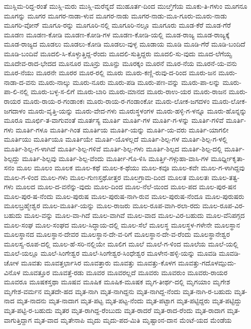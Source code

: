 ಮುಸ್ಲಿಮ-ರಿದ್ದ-ರಂತೆ
ಮುಸ್ಲಿ-ಮರು
ಮುಸ್ಲಿ-ಮರೆನ್ನದೆ
ಮುಹೂರ್ತ-ದಿಂದ
ಮುೞ್ತಿಗೆಯ
ಮೂಕು-ತಿ-ಗಳುಂ
ಮೂಗನೂ
ಮೂಗನ್ನು
ಮೂಗರ
ಮೂಗರ-ನಾಡಾ-ಳುವ
ಮೂಗರ-ನಾಡು
ಮೂಗರ-ನಾಡು-ಮೂ-ಗೂರು-ಮೂರು-ನಾಡು
ಮೂಗರಿ-ವೋನ್
ಮೂಗೂ-ರನ್ನು
ಮೂಗೂರಿ-ನಲ್ಲಿ
ಮೂಗೂರಿ-ನಲ್ಲೂ
ಮೂಗೂರು
ಮೂಡ-ಕೆರೆ
ಮೂಡ-ಗೆರೆ
ಮೂಡಣ
ಮೂಡಣ-ಕೋಡಿ
ಮೂಡಣ-ಕೋಡಿ-ಗಳ
ಮೂಡಣ-ಕೋಡಿ-ಯಲ್ಲಿ
ಮೂಡ-ರಾಜ್ಯ
ಮೂಡ-ರಾಜ್ಯಕ್ಕೆ
ಮೂಡ-ರಾಜ್ಯದ
ಮೂಡಲು
ಮೂಡಲು-ಕೋಡಿ
ಮೂಡಲು-ವುಳ್ಳ
ಮೂಡಾಯ
ಮೂಡಿ
ಮೂಡಿ-ಗೆರೆ
ಮೂಡಿ-ಬಂದಿದೆ
ಮೂಡಿ-ಬಂದಿವೆ
ಮೂದಲಿ-ಸಿ-ಕೊಳ್ಳುತ್ತಿದ್ದ-ರೆಂದು
ಮೂದಲಿ-ಸುತ್ತಿದ್ದರು
ಮೂದಲಿ-ಸು-ವುದು
ಮೂದ-ಲೆಗೆಯ್ವ
ಮೂದೇವ-ರಾದ-ಭೇದದ
ಮೂನೂರ
ಮೂನ್ರು
ಮೂನ್ಱು
ಮೂರಕ್ಕಂ
ಮೂರನೆ
ಮೂರ-ನೆಯ
ಮೂರನೆ-ಯ-ವನು
ಮೂರ-ನೆಯು
ಮೂರನೇ
ಮೂರರ
ಮೂರ-ರಲ್ಲಿ
ಮೂರು
ಮೂರು-ಕಣ್ಣಿ-ರುವು-ದ-ರಿಂದ
ಮೂರು-ಜನ
ಮೂರು-ನಾಡಾ-ದ-ವನು
ಮೂರು-ನಾಲ್ಕು
ಮೂರು-ನೂರು
ಮೂರು-ಪಡಿ
ಮೂರು-ಪಣ-ವನ್ನು
ಮೂರು-ಪಾ-ಲನ್ನು
ಮೂರು-ಪಾ-ಲಿ-ನಲ್ಲಿ
ಮೂರು-ಬಳ್ಳ-ಸ-ಲಿಗೆ
ಮೂರು-ಬಾರಿ
ಮೂರು-ಮಾನದ
ಮೂರು-ರಾಉ-ಯರ
ಮೂರು-ರಾಜನ
ಮೂರು-ರಾಯರ
ಮೂರು-ರಾಯ-ರ-ಗಂಡಾಂಕಃ
ಮೂರು-ರಾಯ-ರ-ಗಂಡಾಂಕೋ
ಮೂರು-ಲೋಕ-ಜಗದಳಂ
ಮೂರು-ಲೋಕ-ಜಗದಾಳಂ
ಮೂರು-ವೃತ್ತಿ-ಯನ್ನು
ಮೂರು-ವೇದ-ಗಳು
ಮೂರುಸ್ಥಳಂಗಳ
ಮೂರು-ಹಳ್ಳಿ-ಗ-ಳನ್ನೂ
ಮೂರು-ಹೊನ್ನನ್ನು
ಮೂರೂ
ಮೂರ್ಛಿ-ತ-ವಾಗುವಂತೆ
ಮೂರ್ತಸ್ಯ
ಮೂರ್ತಿ
ಮೂರ್ತಿ-ಗಳ
ಮೂರ್ತಿ-ಗ-ಳನ್ನು
ಮೂರ್ತಿ-ಗಳಿವೆ
ಮೂರ್ತಿ-ಗಳು
ಮೂರ್ತಿ-ಗಳೂ
ಮೂರ್ತಿ-ಗಿಂತ
ಮೂರ್ತಿಯ
ಮೂರ್ತಿ-ಯನ್ನು
ಮೂರ್ತಿ-ಯ-ವರು
ಮೂರ್ತಿ-ಯಾಗಲೀ
ಮೂರ್ತಿಯು
ಮೂರ್ತಿಯೂ
ಮೂರ್ತಿಯೇ
ಮೂರ್ತಿ-ಯೊಳಲ್ಲದೆ
ಮೂರ್ತಿ-ಶಿಲ್ಪ-ಗಳ
ಮೂರ್ತಿ-ಶಿಲ್ಪ-ಗ-ಳಲ್ಲಿ
ಮೂರ್ತಿ-ಶಿಲ್ಪ-ಗ-ಳಾಗಿವೆ
ಮೂರ್ತಿ-ಶಿಲ್ಪ-ಗಳಿವೆ
ಮೂರ್ತಿ-ಶಿಲ್ಪ-ಗಳು
ಮೂರ್ತಿ-ಶಿಲ್ಪದ
ಮೂರ್ತಿ-ಶಿಲ್ಪ-ದಲ್ಲಿ
ಮೂರ್ತಿ-ಶಿಲ್ಪದ್ದು
ಮೂರ್ತಿ-ಶಿಲ್ಪವು
ಮೂರ್ತಿ-ಶಿಲ್ಪ-ವೆಂದು
ಮೂರ್ತೀ-ಗೊ-ಳಿಸಿ
ಮೂರ್ತ್ತಿ-ಗಳ್ಗುಹಾ-ವಾಸಿ-ಗಳ
ಮೂರ್ಧ್ನೀಕೃತಾ-ಸನಂ
ಮೂಲ
ಮೂಲಂ
ಮೂಲಕ
ಮೂಲ-ಕಥೆ
ಮೂಲ-ಕ-ಥೆಯು
ಮೂಲ-ಕವೂ
ಮೂಲ-ಕವೇ
ಮೂಲ-ಗ-ಳಾಗಿದ್ದವು
ಮೂಲ-ಗ-ಳಿಂದ
ಮೂಲ-ಗಳು
ಮೂಲ-ಗುಣಸ್ತಥೋತ್ತರ
ಮೂಲಗ್ರಾಮ-ದಿಂದ
ಮೂಲತ
ಮೂಲತಃ
ಮೂಲ-ತತ್ವ-ಗಳು
ಮೂಲದ
ಮೂಲ-ದ-ವನೆನ್ನು-ವುದು
ಮೂಲ-ದಿಂದ
ಮೂಲ-ನೆಲೆ-ಯಿಂದ
ಮೂಲ-ಪದ
ಮೂಲ-ಪುರ-ಷನ
ಮೂಲ-ಪುರ-ಷ-ನೆಂದು
ಮೂಲ-ಪುರುಷ
ಮೂಲ-ಪುರುಷ-ನಾಗಿ-ರುವ
ಮೂಲ-ಪುರುಷ-ನೆಂದೂ
ಮೂಲ-ಪುರುಷರು
ಮೂಲಬ್ರಹ್ಮೇಶ್ವರ
ಮೂಲ-ಮೂರ್ತಿ-ಯನ್ನು
ಮೂಲ-ರಾಜರು
ಮೂಲ-ರೂಪ-ವಾಗಿ-ರಲಾ-ರದು
ಮೂಲ-ರೂಪ-ವಿರ-ಬಹುದು
ಮೂಲ-ವನ್ನು
ಮೂಲ-ವಾ-ಗಿದೆ
ಮೂಲ-ವಾಗಿವೆ
ಮೂಲ-ವಾದ
ಮೂಲ-ವಿರ-ಬಹುದು
ಮೂಲ-ವೆನಿಪಗ್ಗದ
ಮೂಲ-ಸಂಘ
ಮೂಲ-ಸಂಘದ
ಮೂಲ-ಸಿದ್ಧಾಯ-ದಲ್ಲಿ
ಮೂಲ-ಸೆಲೆ
ಮೂಲಸ್ಥ
ಮೂಲಸ್ಥಳ-ಗಳೇನೇ
ಮೂಲಸ್ಥಾನ
ಮೂಲಸ್ಥಾನದ
ಮೂಲಸ್ಥಾನ-ದೇವರ
ಮೂಲಸ್ಥಾನ-ದೇ-ವ-ರಿಗೆ
ಮೂಲಸ್ಥಾನ-ದೇ-ವ-ರೆಂದು
ಮೂಲಸ್ಥಾನೇಶ್ವರ
ಮೂಲಸ್ವ-ರೂಪ-ದಲ್ಲಿ
ಮೂಲ-ಹೆ-ಸರಿ-ನಲ್ಲಿಯೇ
ಮೂಲಿಗ
ಮೂಲೆ
ಮೂಲೆ-ಗ-ಳಿಂದ
ಮೂಲೆಯ
ಮೂಲೆ-ಯಲ್ಲಿ
ಮೂಲೆ-ಯಲ್ಲೂ
ಮೂಲೆ-ಸಿಂಗೇಶ್ವರ
ಮೂಲೆ-ಸಿಂಗೇಶ್ವರ-ಸಿಂಧೇಶ್ವರ
ಮೂಳೇನ-ಹಳ್ಳಿ-ಯನ್ನು
ಮೂವಡಿ
ಮೂವಡಿ-ಚೋಳ
ಮೂವತು
ಮೂವತ್ತರ್ಛಾಸಿರ
ಮೂವತ್ತಾರು
ಮೂವತ್ತು
ಮೂವತ್ತು-ಕೊಳಗ
ಮೂವತ್ತು-ಗದೊಳಮ್ಪುದು-ವಿನೊಳ
ಮೂವತ್ತೂರ
ಮೂವತ್ತೆ-ರಡು
ಮೂವರ
ಮೂವರಲ್ಲದೆ
ಮೂವರು
ಮೂವರುಂ
ಮೂವರು-ರಾಯರ
ಮೂವರೂ
ಮೂಷಕಸ್ತಥಾ
ಮೂಷವ
ಮೂಷಿಕ
ಮೂಷಿಕ-ಮೂಷಕ
ಮೃಗ-ತೀರ್ಥ-ದಲ್ಲಿ
ಮೃಗಯಾಂ
ಮೃಗೇಶ
ಮೃಗೇಶ-ವರ್ಮನ
ಮೃತದೇ-ಹದ
ಮೃತ-ನಾಗಿ
ಮೃತ-ನಾಗಿದ್ದನು
ಮೃತ-ನಾಗಿದ್ದ-ನೆಂದು
ಮೃತ-ನಾಗಿ-ರ-ಬಹುದು
ಮೃತ-ನಾದ
ಮೃತ-ನಾದನು
ಮೃತ-ನಾದಾಗ
ಮೃತ-ಪಟ್ಟ
ಮೃತ-ಪಟ್ಟ-ನೆಂದು
ಮೃತ-ಪಟ್ಟಾಗ
ಮೃತ-ಪಟ್ಟಿದ್ದರು
ಮೃತ-ಪಟ್ಟಿದ್ದು
ಮೃತ-ಪಟ್ಟಿ-ರ-ಬಹುದು
ಮೃತರ
ಮೃತ-ರಾಗಿದ್ದ-ರೆಂಬುದು
ಮೃತ-ರಾದರೆ
ಮೃತ-ರಾದ-ರೆಂದು
ಮೃತ-ರಾದಾಗ
ಮೃತ-ವಾಗುತ್ತಿದ್ದಾಗ
ಮೃತ-ವಾದ
ಮೃತೇನಾಪಿ
ಮೃದು
ಮೃದು-ಪದ-ಮಿತಿ
ಮೃಷ್ಟಾಂನ-ದಾನ
ಮೆಂಟೆ-ಯದ
ಮೆಂಡೆಯ
